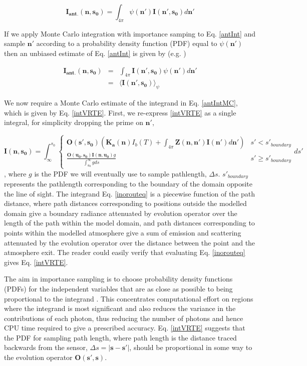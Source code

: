 \begin{equation}
\mathbf{I_{ant.}(n,s_0)}=\int_{4\pi}\psi(\mathbf{n'})\mathbf{I(n',s_0)}d\mathbf{n'}
\label{antInt}
\end{equation}

If we apply Monte Carlo integration with importance samping to
Eq. \ref{antInt} and sample $\mathbf{n'}$ according to a probability
density function (PDF) equal to $\psi(\mathbf{n'})$ then an unbiased
estimate of Eq. \ref{antInt} is given by (e.g. \cite{press:1992:numerical})

\begin{eqnarray}
\mathbf{I_{ant.}(n,s_0)}&=&\int_{4\pi}\mathbf{I(n',s_0)}\psi(\mathbf{n'})d\mathbf{n'}\\
&=&\langle \mathbf{I(n',s_0)} \rangle_\psi
\label{antIntMC}
\end{eqnarray}

We now require a Monte Carlo estimate of the integrand in
Eq. \ref{antIntMC}, which is given by Eq. \ref{intVRTE}.  First, we
re-express \ref{intVRTE} as a single integral, for simplicity dropping
the prime on $\mathbf{n'}$,

\begin{equation}
\mathbf{I(n,s_0)}=\int^{s_0}_\infty\left\{\begin{array}{rl}
\mathbf{O(s',s_0)}\left(\mathbf{K_a(n)}I_b(T)
+\int_{4\pi}\mathbf{Z(n,n')}\mathbf{I(n')}d\mathbf{n'}\right) & s'< s'_{boundary} \\
\frac{\mathbf{O(u_0,s_0)I(n,u_0)}g}{\int^\infty_{u_0}gds} & s'\ge s'_{boundary}
\end{array}ds'\right.
\label{inorouteq}
\end{equation}
, where $g$ is the PDF we will eventually use to sample pathlength,
$\Delta s$. $s'_{boundary}$ represents the pathlength corresponding to
the boundary of the domain opposite the line of sight.
The integrand Eq. \ref{inorouteq} is a piecewise function of the
path distance, where path distances corresponding to positions outside
the modelled domain give a boundary radiance attenuated by evolution
operator over the length of the path within the model domain, and path
distances corresponding to points within the modelled atmosphere give
a sum of emission and scattering attenuated by the evolution operator
over the distance between the point and the atmosphere exit. 
The reader
could easily verify that evaluating Eq. \ref{inorouteq} gives
Eq. \ref{intVRTE}. 

The aim in importance sampling is to choose probability density functions
(PDFs) for the independent variables that are
as close as possible to being proportional to the integrand
\cite{liu:01}. This concentrates computational effort on regions where
the integrand is most significant and also reduces the variance in the contributions of each photon, thus reducing
the number of photons and hence CPU time required to give a
prescribed accuracy.  Eq. \ref{intVRTE} suggests that the PDF for
sampling path length, where path length is the distance traced backwards
from the sensor, $\Delta s=\left|\mathbf{s}-\mathbf{s'}\right|$, should be proportional in some way to the evolution
operator $\mathbf{O(s',s)}$. 

